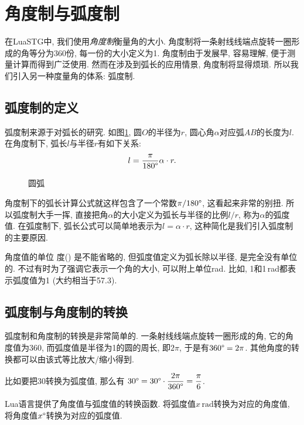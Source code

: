 \section{角度制与弧度制} \label{radian}

在LuaSTG中, 我们使用\emph{角度制}衡量角的大小.
角度制将一条射线线端点旋转一圈形成的角等分为360份,
每一份的大小定义为1\degree.
角度制由于发展早, 容易理解, 便于测量计算而得到广泛使用.
然而在涉及到弧长的应用情景, 角度制将显得烦琐.
所以我们引入另一种度量角的体系: 弧度制.

\subsection{弧度制的定义}

弧度制来源于对弧长的研究. 如图\ref{fig:arc},
圆$O$的半径为$r$, 圆心角$\alpha$对应弧$AB$的长度为$l$.
在角度制下, 弧长$l$与半径$r$有如下关系:
\[
  l = \dfrac{\pi}{180\degree} \alpha\cdot r.
\]

\begin{figure}[htbp]
  \centering
  \caption{圆弧}
  \label{fig:arc}
\end{figure}

角度制下的弧长计算公式就这样包含了一个常数$\pi / 180\degree$,
这看起来非常的别扭. 所以弧度制大手一挥,
直接把角$\alpha$的大小定义为弧长与半径的比例$l/r$,
称为$\alpha$的弧度值.
在弧度制下, 弧长公式可以简单地表示为$l=\alpha\cdot r$,
这种简化是我们引入弧度制的主要原因.

角度值的单位 度(\degree) 是不能省略的,
但弧度值定义为弧长除以半径, 是完全没有单位的.
不过有时为了强调它表示一个角的大小, 可以附上单位rad.
比如, 1和1\,rad都表示弧度值为1
(大约相当于57.3\degree).

\subsection{弧度制与角度制的转换}

弧度制和角度制的转换是非常简单的.
一条射线线端点旋转一圈形成的角,
它的角度值为360\degree, 而弧度值是半径为1的圆的周长, 即$2\pi$,
于是有$360\degree = 2\pi$.
其他角度的转换都可以由该式等比放大/缩小得到.

比如要把30\degree 转换为弧度值, 那么有
$30\degree = 30\degree\cdot\dfrac{2\pi}{360\degree}
= \dfrac{\pi}{6}$.

Lua语言提供了角度值与弧度值的转换函数.
将弧度值$x\,\text{rad}$转换为对应的角度值,
将角度值$x\degree$转换为对应的弧度值.
